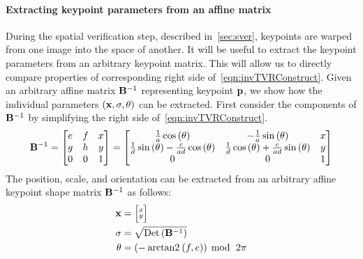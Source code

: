         \paragraph{Extracting keypoint parameters from an affine matrix}
        During the spatial verification step, described in~\cref{sec:sver}, keypoints are warped from one image
        into the space of another. It will be useful to extract the keypoint parameters from an arbitrary keypoint
        matrix. This will allow us to directly compare properties of corresponding right side
        of~\cref{eqn:invTVRConstruct}. Given an arbitrary affine matrix $\mathbf{B}^{-1}$ representing keypoint $\mathbf{p}$,
        we show how the individual parameters $(\mathbf{x}, \sigma, \theta)$ can be extracted. First consider the components
        of $\mathbf{B}^{-1}$ by simplifying the right side of~\cref{eqn:invTVRConstruct}.
        \begin{equation}\label{eqn:ArbInvRVTMat}
            \mathbf{B}^{-1} = 
             \left[ \begin{matrix} 
            e & f & x\\
            g & h & y\\
            0 & 0 & 1
             \end{matrix} \right]  = 
             \left[ \begin{matrix} 
            \frac{1}{a} \cos{(\theta )}                                 & -\frac{1}{a} \sin{(\theta )}                                & x\\
            \frac{1}{d} \sin{(\theta )} - \frac{c}{a d} \cos{(\theta )} & \frac{1}{d} \cos{(\theta )} + \frac{c}{a d} \sin{(\theta )} & y\\
            0                                                           & 0                                                           & 1
             \end{matrix} \right] 
        \end{equation}
        The position, scale, and orientation can be extracted from an arbitrary affine keypoint shape matrix
        $\mathbf{B}^{-1}$ as follows:
        \begin{equation}\label{eqn:affinewarp}
            \begin{aligned}
                \mathbf{x}     &=  \Bigl[\negthinspace \begin{smallmatrix} x\\y \end{smallmatrix} \negthinspace \Bigr]  \\
                \sigma  &= \sqrt{\mathbin{\textrm{Det}}\left(\mathbf{B}^{-1}\right)}\\
                \theta    &= \left(-\mathbin{\operatorname{arctan2}}\left(f, e\right)\right)\; \operatorname{mod}{} \;\,2\pi
            \end{aligned}
        \end{equation}


\newcommand{\annotscoreop}{\opname{K_{\tt annot}}}
\newcommand{\amechscoreop}{\opname{K_{\csum}}}
\newcommand{\fmechscoreop}{\opname{K_{\nsum}}}

